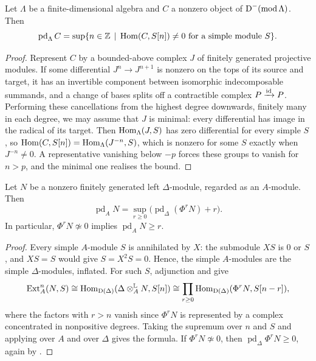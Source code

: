 \begin{lemma}
  \label{lemma:pd-detection}
  Let $\Lambda$ be a finite-dimensional algebra and $C$ a nonzero object of
  ${\DerCat[-]{\operatorname{mod}\Lambda}}$. Then
  \[
    \operatorname{pd}_\Lambda C=\sup\set{n\in\ZZ}[\Hom{C}{S[n]}\neq0
    \text{ for a simple module }S].
  \]
\end{lemma}

\begin{proof}
  Represent $C$ by a bounded-above complex $J$ of finitely generated
  projective modules. If some differential ${J^{n}\to J^{n+1}}$ is nonzero on the
  tops of its source and target, it has an invertible component between
  isomorphic indecomposable summands, and a change of bases splits off a
  contractible complex ${P\xrightarrow{\id}P}$. Performing these cancellations
  from the highest degree downwards, finitely many in each degree, we may assume
  that $J$ is minimal: every differential has image in the radical of its
  target. Then $\Hom[\Lambda]{J}{S}$ has zero differential for every simple
  $S$, so ${\Hom{C}{S[n]}=\Hom[\Lambda]{J^{-n}}{S}}$, which is nonzero for some
  $S$ exactly when ${J^{-n}\neq0}$. A representative vanishing below ${-p}$ forces
  these groups to vanish for ${n>p}$, and the minimal one realises the bound.
\end{proof}

\begin{proposition}
  \label{prop:pd-formula}
  Let $N$ be a nonzero finitely generated left $\Delta$-module, regarded as an
  $A$-module. Then
  \[
    \operatorname{pd}_AN=\sup_{r\geq0}\bigl(\operatorname{pd}_\Delta(\Phi^rN)
    +r\bigr).
  \]
  In particular, ${\Phi^rN\not\simeq0}$ implies ${\operatorname{pd}_AN\geq r}$.
\end{proposition}

\begin{proof}
  Every simple $A$-module $S$ is annihilated by $X$: the submodule $XS$ is $0$
  or $S$, and ${XS=S}$ would give ${S=X^2S=0}$. Hence, the simple $A$-modules are
  the
  simple $\Delta$-modules, inflated. For such $S$, adjunction and
   give
  \[
    \operatorname{Ext}^n_A(N,S)\cong\Hom[\DerCat{\Delta}]{\Delta\Lotimes[A]N}
    {S[n]}\cong\prod_{r\geq0}\Hom[\DerCat{\Delta}]{\Phi^rN}{S[n-r]},
  \]
  where the factors with ${r>n}$ vanish since $\Phi^rN$ is represented by a
  complex concentrated in nonpositive degrees. Taking the supremum over $n$
  and $S$ and applying  over $A$ and over $\Delta$
  gives the formula. If ${\Phi^rN\not\simeq0}$, then
  ${\operatorname{pd}_\Delta\Phi^rN\geq0}$, again by .
\end{proof}

